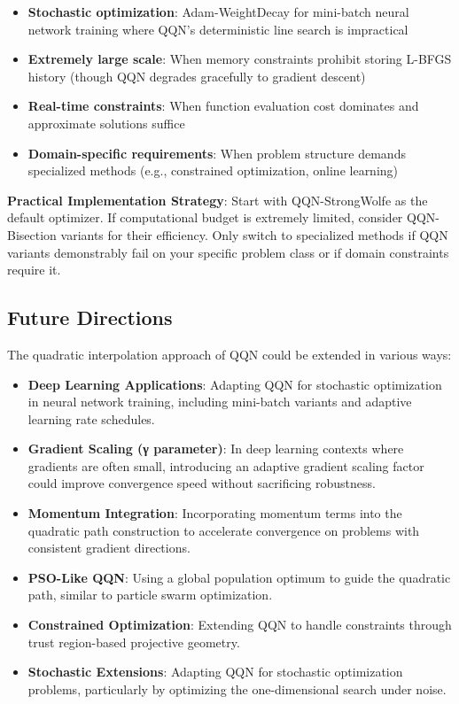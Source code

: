 \begin{itemize}
\tightlist
\item
  \textbf{Stochastic optimization}: Adam-WeightDecay for mini-batch neural network training where QQN's deterministic line search is impractical
\item
  \textbf{Extremely large scale}: When memory constraints prohibit storing L-BFGS history (though QQN degrades gracefully to gradient descent)
\item
  \textbf{Real-time constraints}: When function evaluation cost dominates and approximate solutions suffice
\item
  \textbf{Domain-specific requirements}: When problem structure demands specialized methods (e.g., constrained optimization, online learning)
\end{itemize}

\textbf{Practical Implementation Strategy}: Start with QQN-StrongWolfe as the default optimizer. If computational budget is extremely limited, consider QQN-Bisection variants for their efficiency. Only switch to specialized methods if QQN variants demonstrably fail on your specific problem class or if domain constraints require it.

\hypertarget{future-directions}{%
\subsection{Future Directions}\label{future-directions}}

The quadratic interpolation approach of QQN could be extended in various ways:

\begin{itemize}
\tightlist
\item
  \textbf{Deep Learning Applications}: Adapting QQN for stochastic optimization in neural network training, including mini-batch variants and adaptive learning rate schedules.
\item
  \textbf{Gradient Scaling (γ parameter)}: In deep learning contexts where gradients are often small, introducing an adaptive gradient scaling factor could improve convergence speed without sacrificing robustness.
\item
  \textbf{Momentum Integration}: Incorporating momentum terms into the quadratic path construction to accelerate convergence on problems with consistent gradient directions.
\item
  \textbf{PSO-Like QQN}: Using a global population optimum to guide the quadratic path, similar to particle swarm optimization.
\item
  \textbf{Constrained Optimization}: Extending QQN to handle constraints through trust region-based projective geometry.
\item
  \textbf{Stochastic Extensions}: Adapting QQN for stochastic optimization problems, particularly by optimizing the one-dimensional search under noise.
\end{itemize}

